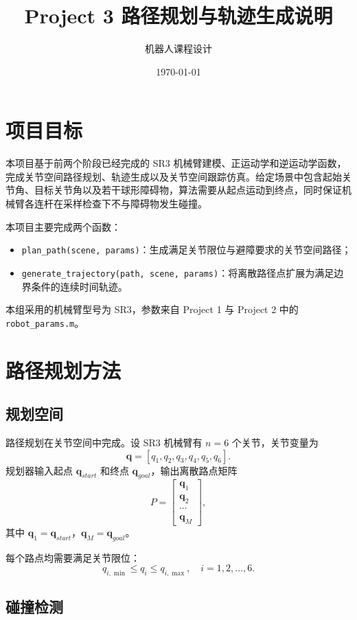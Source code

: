 \documentclass[UTF8,a4paper,12pt]{ctexart}
\title{Project 3 路径规划与轨迹生成说明}
\author{机器人课程设计}
\date{\today}
\begin{document}
\maketitle

\section{项目目标}

本项目基于前两个阶段已经完成的 SR3 机械臂建模、正运动学和逆运动学函数，完成关节空间路径规划、轨迹生成以及关节空间跟踪仿真。给定场景中包含起始关节角、目标关节角以及若干球形障碍物，算法需要从起点运动到终点，同时保证机械臂各连杆在采样检查下不与障碍物发生碰撞。

本项目主要完成两个函数：

\begin{itemize}
    \item \texttt{plan\_path(scene, params)}：生成满足关节限位与避障要求的关节空间路径；
    \item \texttt{generate\_trajectory(path, scene, params)}：将离散路径点扩展为满足边界条件的连续时间轨迹。
\end{itemize}

本组采用的机械臂型号为 SR3，参数来自 Project 1 与 Project 2 中的 \texttt{robot\_params.m}。

\section{路径规划方法}

\subsection{规划空间}

路径规划在关节空间中完成。设 SR3 机械臂有 $n=6$ 个关节，关节变量为
\[
    \mathbf{q} = [q_1,q_2,q_3,q_4,q_5,q_6].
\]
规划器输入起点 $\mathbf{q}_{start}$ 和终点 $\mathbf{q}_{goal}$，输出离散路点矩阵
\[
    P =
    \begin{bmatrix}
    \mathbf{q}_1 \\
    \mathbf{q}_2 \\
    \cdots \\
    \mathbf{q}_M
    \end{bmatrix},
\]
其中 $\mathbf{q}_1=\mathbf{q}_{start}$，$\mathbf{q}_M=\mathbf{q}_{goal}$。

每个路点均需要满足关节限位：
\[
    q_{i,\min} \le q_i \le q_{i,\max}, \quad i=1,2,\ldots,6.
\]

\subsection{碰撞检测}
\end{document}
